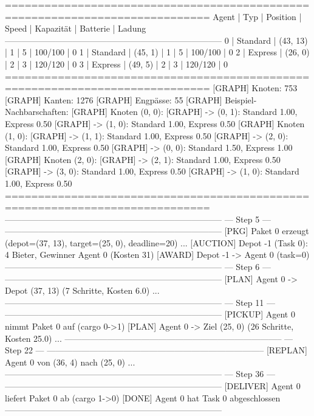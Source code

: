 =============================================================================
 Agent | Typ       | Position    | Speed   | Kapazität  | Batterie  | Ladung
-----------------------------------------------------------------------------
 0     | Standard  | (43, 13)    | 1       | 5          | 100/100   | 0
 1     | Standard  | (45, 1)     | 1       | 5          | 100/100   | 0
 2     | Express   | (26, 0)     | 2       | 3          | 120/120   | 0
 3     | Express   | (49, 5)     | 2       | 3          | 120/120   | 0
=============================================================================
[GRAPH]    Knoten:              753
[GRAPH]    Kanten:              1276
[GRAPH]    Engpässe:            55
[GRAPH]    Beispiel-Nachbarschaften:
[GRAPH]      Knoten (0, 0):
[GRAPH]        -> (0, 1): Standard 1.00, Express 0.50
[GRAPH]        -> (1, 0): Standard 1.00, Express 0.50
[GRAPH]      Knoten (1, 0):
[GRAPH]        -> (1, 1): Standard 1.00, Express 0.50
[GRAPH]        -> (2, 0): Standard 1.00, Express 0.50
[GRAPH]        -> (0, 0): Standard 1.50, Express 1.00
[GRAPH]      Knoten (2, 0):
[GRAPH]        -> (2, 1): Standard 1.00, Express 0.50
[GRAPH]        -> (3, 0): Standard 1.00, Express 0.50
[GRAPH]        -> (1, 0): Standard 1.00, Express 0.50
=============================================================================
-----------------------------------------------------------------------------
                                --- Step 5 ---
-----------------------------------------------------------------------------
[PKG]      Paket 0 erzeugt (depot=(37, 13), target=(25, 0), deadline=20)
...
[AUCTION] Depot -1 (Task 0): 4 Bieter, Gewinner Agent 0 (Kosten 31)
[AWARD]    Depot -1 -> Agent 0 (task=0)
-----------------------------------------------------------------------------
                                --- Step 6 ---
-----------------------------------------------------------------------------
[PLAN]      Agent 0 -> Depot (37, 13) (7 Schritte, Kosten 6.0)
...
-----------------------------------------------------------------------------
                                --- Step 11 ---
-----------------------------------------------------------------------------
[PICKUP]  Agent 0 nimmt Paket 0 auf (cargo 0->1)
[PLAN]      Agent 0 -> Ziel (25, 0) (26 Schritte, Kosten 25.0)
...
-----------------------------------------------------------------------------
                                --- Step 22 ---
-----------------------------------------------------------------------------
[REPLAN]    Agent 0 von (36, 4) nach (25, 0)
...
-----------------------------------------------------------------------------
                                --- Step 36 ---
-----------------------------------------------------------------------------
[DELIVER] Agent 0 liefert Paket 0 ab (cargo 1->0)
[DONE]      Agent 0 hat Task 0 abgeschlossen
-----------------------------------------------------------------------------